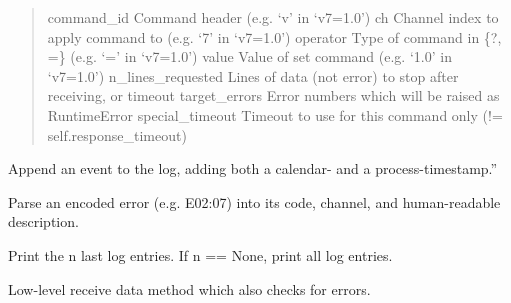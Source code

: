 \documentclass[letterpaper,10pt,english]{sphinxmanual}
\begin{document}
\begin{fulllineitems}
\begin{fulllineitems}
\begin{quote}
command\_id                      Command header (e.g. ‘v’ in ‘v7=1.0’)
ch                                      Channel index to apply command to (e.g. ‘7’ in ‘v7=1.0’)
operator                        Type of command in \{?, =\} (e.g. ‘=’ in ‘v7=1.0’)
value                           Value of set command (e.g. ‘1.0’ in ‘v7=1.0’)
n\_lines\_requested       Lines of data (not error) to stop after receiving, or timeout
target\_errors           Error numbers which will be raised as RuntimeError
special\_timeout         Timeout to use for this command only (!= self.response\_timeout)
\end{quote}

\end{fulllineitems}


\begin{fulllineitems}
\label{\detokenize{qontrol:qontrol.Qontroller.log_append}}
Append an event to the log, adding both a calendar- and a process-timestamp.”

\end{fulllineitems}


\begin{fulllineitems}
\label{\detokenize{qontrol:qontrol.Qontroller.parse_error}}
Parse an encoded error (e.g. E02:07) into its code, channel, and human-readable description.

\end{fulllineitems}


\begin{fulllineitems}
\label{\detokenize{qontrol:qontrol.Qontroller.print_log}}
Print the n last log entries. If n == None, print all log entries.

\end{fulllineitems}


\begin{fulllineitems}
\label{\detokenize{qontrol:qontrol.Qontroller.receive}}
Low-level receive data method which also checks for errors.


\end{fulllineitems}
\end{fulllineitems}
\end{document}
